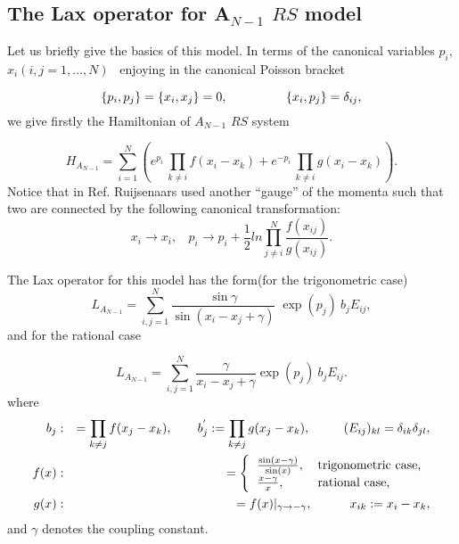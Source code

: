 \documentclass[a4paper,12pt]{article}
\begin{document}
\subsection{The Lax operator for A$_{N-1}$ $RS$ model}

Let us briefly give the basics of this model. In terms of the canonical
variables $p_{i}$, $x_{i}(i,j=1,\ldots ,N)$ \ enjoying in the canonical
Poisson bracket

\begin{equation}
\{p_{i},p_{j}\}=\{x_{i},x_{j}\}=0,\mbox{$ \ \ \ \ \ \ \ \ \ \ \ \ \ \ $}%
\{x_{i},p_{j}\}=\delta _{ij},  \label{poisson}
\end{equation}
we give firstly the Hamiltonian of $A_{N-1}$ $RS$ system

\begin{equation}
H_{A_{N-1}}=\sum_{i=1}^{N}\left(e^{p_{i}}\,\prod_{k\neq
i}f(x_{i}-x_{k})+e^{-p_{i}}\,\prod_{k\neq i}g(x_{i}-x_{k})\right).
\label{anhami}
\end{equation}
Notice that in Ref. \cite{r1} Ruijsenaars used another ``gauge'' of the momenta
such that two are connected by the following canonical transformation:
\begin{equation}
x_{i}\longrightarrow x_{i},\ \ \ \ p_{i}\longrightarrow p_{i}+\frac{1}{2}%
ln\prod_{j\neq i}^{N}\frac{f(x_{ij})}{g(x_{ij})}.
\end{equation}

\vspace{1pt}The Lax operator for this model has the form(for the
trigonometric case)
\[
L_{A_{N-1}}=\sum_{i,j=1}^{N}\frac{\sin \gamma }{\sin (x_{i}-x_{j}+\gamma )}\;%
\mathrm{\exp }(p_{j})\ b_{j}E_{ij},
\]
and for the rational case

\begin{equation}
L_{A_{N-1}}=\sum_{i,j=1}^{N}\frac{\gamma }{x_{i}-x_{j}+\gamma }\mathrm{\exp }%
(p_{j})\ b_{j}E_{ij}.
\end{equation}
where
\begin{eqnarray}
b_{j} &:&=\prod_{k\neq j}f(x_{j}-x_{k}),\ \ \ \ \ \ b_{j}^{^{\prime
}}:=\prod_{k\neq j}g(x_{j}-x_{k}),\ \ \ \ \ \ \ \ (E_{ij})_{kl}=\delta
_{ik}\delta _{jl},  \nonumber \\
f(x) &:&=\left\{
\begin{tabular}{ll}
$\frac{\sin (x-\gamma )}{\sin (x)},$ & trigonometric case, \\
$\frac{x-\gamma }{x},$ & rational case,
\end{tabular}
\right.	 \nonumber \\
g(x) &:&=f(x)|_{\gamma \rightarrow -\gamma },\ \ \ \ \ \ \ \ \
x_{ik}:=x_{i}-x_{k},  \label{fg}
\end{eqnarray}
and $\gamma $ denotes the coupling constant.
\end{document}
